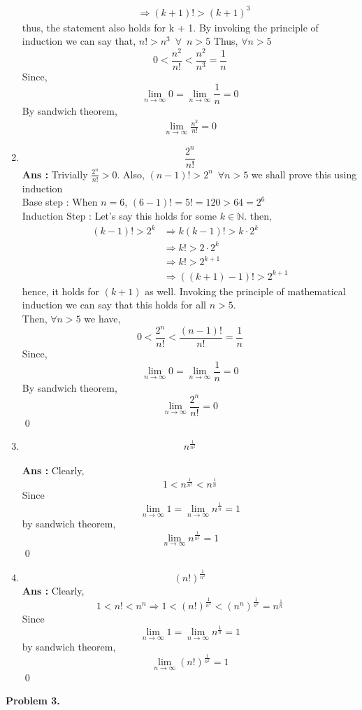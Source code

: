 \documentclass[10pt]{article}
\newcommand{\nn}{\mathbb{N}}
\newcommand{\inflim}{\lim_{n\to\infty}}
\newcommand{\sol}{\textbf{Ans : }}
\begin{document}
\begin{enumerate}[label={(\roman*)}]
\begin{align*}
            &\Rightarrow (k+1)! > (k+1)^3
        \end{align*}
        thus, the statement also holds for k + 1. By invoking the principle of induction we can say that, 
        $n! > n^3 \,\,\, \forall \,\,\, n > 5$
        Thus, $\forall n > 5$
        $$0<\frac{n^2}{n!}<\frac{n^2}{n^3}=\frac{1}{n}$$
        Since,
        $$\inflim 0 = \inflim \frac{1}{n} = 0$$
        By sandwich theorem,
        \begin{align*}
            \inflim \frac{n^2}{n!} = 0 \tag*{\qed}
        \end{align*}
        \item $$\frac{2^n}{n!}$$
        \sol Trivially $\frac{2^n}{n!} > 0$. Also, $(n-1)! > 2^n\,\,\,\forall n > 5$ we shall prove this using induction \\ Base step : When $n = 6$, $(6 - 1)! = 5! = 120 > 64 = 2^6$\\
        Induction Step : Let's say this holds for some $k \in \nn$. then,
        \begin{align*}
            (k - 1)! > 2^k &\Rightarrow k(k-1)! > k\cdot2^k\\
            &\Rightarrow k! > 2\cdot2^k\\
            &\Rightarrow k! > 2^{k+1}\\
            &\Rightarrow ((k + 1) - 1)! > 2^{k + 1}
        \end{align*}
        hence, it holds for $(k+1)$ as well. Invoking the principle of mathematical induction we can say that this holds for all $n > 5$.\\
        Then, $\forall n >5$ we have, 
        $$0<\frac{2^n}{n!}<\frac{(n-1)!}{n!} = \frac{1}{n}$$
        Since, $$\inflim 0 = \inflim \frac{1}{n} = 0$$
        By sandwich theorem, $$\inflim \frac{2^n}{n!} = 0$$ \qed\\
        \item $$n^\frac{1}{n^2}$$ \\
        \sol Clearly, $$1 < n^\frac{1}{n^2}<n^\frac{1}{n}$$Since $$\inflim 1 = \inflim n^\frac{1}{n} = 1$$ by sandwich theorem, $$\inflim n^\frac{1}{n^2} = 1$$ \qed\\
        \item $$(n!)^\frac{1}{n^2}$$
        \sol Clearly, $$1<n!<n^n \Rightarrow 1 < (n!)^\frac{1}{n^2}<(n^n)^\frac{1}{n^2}=n^\frac{1}{n}$$ Since $$\inflim 1 = \inflim n^\frac{1}{n} = 1$$ by sandwich theorem, $$\inflim (n!)^\frac{1}{n^2} = 1$$ \qed
        \end{enumerate}
        \textbf{Problem 3.}
\end{document}
